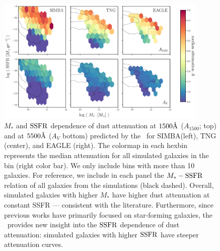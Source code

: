 \begin{figure}
\begin{center}
    \includegraphics[width=0.9\textwidth]{figs/abc_av_mssfr.pdf}
    \caption{\label{fig:avmsfr}
        $M_*$ and ${\rm SSFR}$ dependence of dust attenuation at $1500 \AA$
        ($A_{1500}$; top) and at $5500\AA$ ($A_{V}$ bottom) predicted by the
        \eda~for SIMBA(left), TNG (center), and EAGLE (right). The colormap in each hexbin 
        represents the median attenuation for all simulated galaxies in the
        bin (right color bar). We only include bins with more than 10 galaxies.
        For reference, we include in each panel the $M_*-{\rm SSFR}$ relation of
        all galaxies from the simulations (black dashed).
        Overall, simulated galaxies with higher $M_*$ have higher dust
        attenuation at constant SSFR --- consistent with the literature.
        Furthermore, since previous works have primarily focused on star-forming
        galaxies, the \eda~provides new insight into the ${\rm SSFR}$ dependence of
        dust attenuation: simulated galaxies with higher ${\rm SSFR}$ have steeper
        attenuation curves. 
    }
\end{center}
\end{figure}

